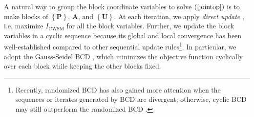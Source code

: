 \documentclass[9pt,journal]{IEEEtran}
\newcommand{\paren}[1]{\left({#1}\right)}
\newcommand{\braces}[1]{{\left\{ {#1}\right\}}}
\theoremstyle{definition}
\begin{document}

A natural way to group the block coordinate variables to solve $\paren{\ref{jointop}}$ is to make blocks of $\braces{\mathbf{P}}$, $\mathbf{A}$, and $\braces{\mathbf{U}}$. %
At each iteration, we apply \textit{direct update} \cite{BCDconvergence}, i.e. maximize %
$I_{\textrm{CWSM}}$ for all the block variables. %
Further, we update the block variables in a cyclic sequence because its global and local convergence has been well-established \cite{BCDconvergence,Lops2019serveillance} 
compared to other sequential update rules\footnote{Recently, randomized BCD has also gained more attention when the sequences or iterates generated by BCD are divergent; otherwise, cyclic BCD may still outperform the randomized BCD \cite{ADMMBCD}.}. In particular, we adopt the Gauss-Seidel BCD \cite{BCDconvergence}, which minimizes the objective function cyclically over each block while keeping the other blocks fixed. 
\end{document}
